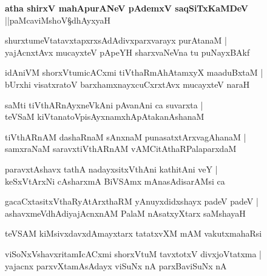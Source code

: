 \begin{center}
\textbf{\large atha shirxV mahApurANeV pAdemxV saqSiTxKaMDeV}\\
||paMcaviMshoV\S dhAyxyaH
\end{center}

\begin{shloka}
shurxtumeVtatavxtapxrxsAdAdivxparxvarayx purAtanaM |\\
yajAcnxtAvx mucayxteV pApeYH sharxvaNeVna tu puNayxBAkf 
\end{shloka}

\begin{shloka}
idAniVM shorxVtumicACxmi tiVthaRmAhAtamxyX maaduBxtaM |\\
bUrxhi visatxratoV barxhamxnayxcuCxrxtAvx mucayxteV naraH 
\end{shloka}

\begin{shloka}
saMti tiVthARnAyxneVkAni pAvanAni ca suvarxta |\\
teVSaM kiVtanatoVpisAyxnamxhApAtakanAshanaM 
\end{shloka}

\begin{shloka}
tiVthARnAM dashaRnaM sAnxnaM punasatxtArxvagAhanaM |\\
samxraNaM saravxtiVthARnAM vAMCitAthaRPalaparxdaM
\end{shloka}

\begin{shloka}
paravxtAshavx tathA nadayxsitxVthAni kathitAni veY |\\
keSxVtArxNi cAsharxmA BiVSAmx mAnasAdisarAMsi ca
\end{shloka}

\begin{shloka}
gacaCxtasitxVthaRyAtArxthaRM yAnuyxdidxshayx padeV padeV |\\
ashavxmeVdhAdiyajAcnxnAM PalaM nAsatxyXtarx saMshayaH 
\end{shloka}

\begin{shloka}
teVSAM kiMsivxdavxdAmayxtarx tatatxvXM mAM vakutxmahaRsi
\end{shloka}

\begin{shloka}
viSoNxVshavxritamIcACxmi shorxVtuM tavxtotxV divxjoVtatxma |\\
yajacnx parxvXtamAsAdayx viSuNx nA parxBaviSuNx nA 
\end{shloka}

